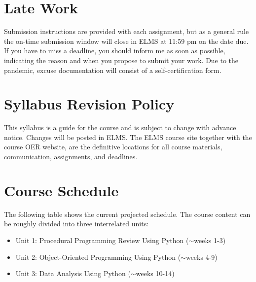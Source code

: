 \documentclass[11pt]{article}
\begin{document}
\section{Late Work}
Submission instructions are provided with each assignment, but as a general rule the on-time submission window will close in ELMS at 11:59 pm on the date due. If you have to miss a deadline, you should inform me as soon as possible, indicating the reason and when you propose to submit your work. Due to the pandemic, excuse documentation will consist of a self-certification form.

\section{Syllabus Revision Policy}
This syllabus is a guide for the course and is subject to change with advance notice. Changes will be posted in ELMS. The ELMS course site together with the course OER website, are the definitive locations for all course materials, communication, assignments, and deadlines.

\section{Course Schedule}
The following table shows the current projected schedule. The course content can be roughly divided into three interrelated units:

\begin{itemize}
	\item Unit 1: Procedural Programming Review Using Python ($\sim$weeks 1-3)
	\item Unit 2: Object-Oriented Programming Using Python ($\sim$weeks 4-9)
	\item Unit 3: Data Analysis Using Python ($\sim$weeks 10-14)
\end{itemize}
\end{document}
